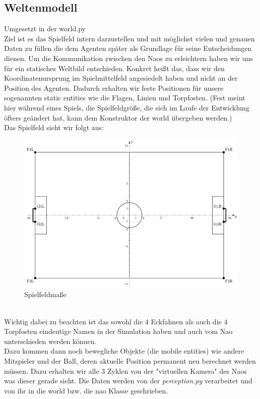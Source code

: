 \subsection*{Weltenmodell }
Umgesetzt in der world.py\\
Ziel ist es das Spielfeld intern darzustellen und mit möglichst 
vielen und genauen Daten zu füllen die dem Agenten später als Grundlage 
für seine Entscheidungen dienen.
Um die Kommunikation zwischen den Naos zu erleichtern haben wir uns für 
ein statisches Weltbild entschieden. Konkret heißt das, dass wir den 
Koordinatenursprung im Spielmittelfeld angesiedelt haben und nicht an 
der Position des Agenten. Dadurch erhalten wir feste Positionen für 
unsere sogenannten static entities wie die Flagen, Linien und 
Torpfosten. (Fest meint hier während eines Spiels, die Spielfeldgröße, 
die sich im Laufe der Entwicklung öfters geändert hat, kann dem 
Konstruktor der world übergeben werden.)\\
Das Spielfeld sieht wir folgt aus:\\
\begin{figure}[h]
\begin{center}
\includegraphics[scale=2.6]{800px-SoccerSimulation_FieldPlan}
\end{center}
\caption{Spielfeldmaße}
\end{figure}
\\
Wichtig dabei zu beachten ist das sowohl die 4 Eckfahnen als auch
 die 4 Torpfosten eindeutige Namen in der Simulation haben und auch vom 
Nao unterschieden werden können.\\
Dazu kommen dann noch bewegliche Objekte (die mobile entities) 
wie andere Mitspieler und der Ball, deren aktuelle Position permanent 
neu berechnet werden müssen. Dazu erhalten wir alle 3 Zyklen von der 
"virtuellen Kamera" des Naos was dieser gerade sieht. Die Daten werden 
von der \textit{perception.py} verarbeitet und von ihr in die world bzw. die nao Klasse geschrieben.

